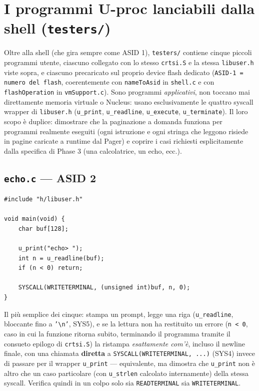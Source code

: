 \documentclass[11pt,a4paper]{article}
\newcommand{\code}[1]{\texttt{#1}}
\begin{document}
\section{I programmi U-proc lanciabili dalla shell (\code{testers/})}

Oltre alla shell (che gira sempre come ASID 1), \code{testers/} contiene
cinque piccoli programmi utente, ciascuno collegato con lo stesso
\code{crtsi.S} e la stessa \code{libuser.h} viste sopra, e ciascuno
precaricato sul proprio device flash dedicato (\code{ASID-1 = numero del
flash}, coerentemente con \code{nameToAsid} in \code{shell.c} e con
\code{flashOperation} in \code{vmSupport.c}). Sono programmi
\emph{applicativi}, non toccano mai direttamente memoria virtuale o
Nucleus: usano esclusivamente le quattro syscall wrapper di
\code{libuser.h} (\code{u\_print}, \code{u\_readline}, \code{u\_execute},
\code{u\_terminate}). Il loro scopo è duplice: dimostrare che la
paginazione a domanda funziona per programmi realmente eseguiti (ogni
istruzione e ogni stringa che leggono risiede in pagine caricate a runtime
dal Pager) e coprire i casi richiesti esplicitamente dalla specifica di
Phase 3 (una calcolatrice, un echo, ecc.).

\subsection{\code{echo.c} --- ASID 2}
\begin{lstlisting}
#include "h/libuser.h"

void main(void) {
    char buf[128];

    u_print("echo> ");
    int n = u_readline(buf);
    if (n < 0) return;

    SYSCALL(WRITETERMINAL, (unsigned int)buf, n, 0);
}
\end{lstlisting}
Il più semplice dei cinque: stampa un prompt, legge una riga
(\code{u\_readline}, bloccante fino a \code{'\textbackslash n'}, SYS5), e se
la lettura non ha restituito un errore (\code{n < 0}, caso in cui la
funzione ritorna subito, terminando il programma tramite il consueto
epilogo di \code{crtsi.S}) la ristampa \emph{esattamente com'è}, incluso il
newline finale, con una chiamata \textbf{diretta} a
\code{SYSCALL(WRITETERMINAL, ...)} (SYS4) invece di passare per il wrapper
\code{u\_print} --- equivalente, ma dimostra che \code{u\_print} non è
altro che un caso particolare (con \code{u\_strlen} calcolato
internamente) della stessa syscall. Verifica quindi in un colpo solo sia
\code{READTERMINAL} sia \code{WRITETERMINAL}.
\end{document}
